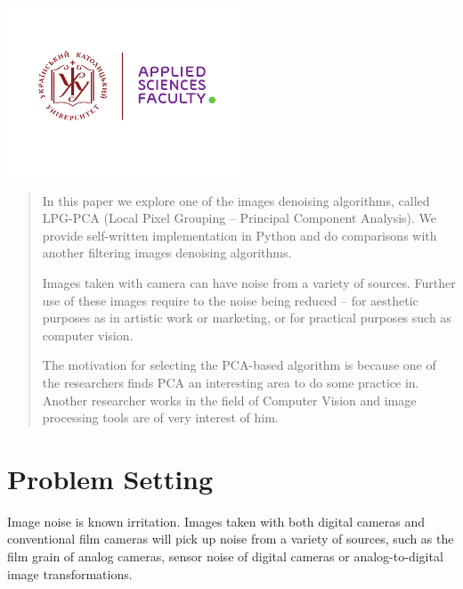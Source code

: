 \begin{titlepage}

\includegraphics[height=5cm]{UCU-Apps.png}\\[1cm] %
 

\vfill %

\end{titlepage}

\begin{abstract}
In this paper we explore one of the images denoising algorithms, called LPG-PCA (Local Pixel Grouping – Principal Component Analysis). We provide self-written implementation in Python and do comparisons with another filtering images denoising algorithms. 

Images taken with camera can have noise from a variety of sources. Further use of these images require to the noise being reduced – for aesthetic purposes as in artistic work or marketing, or for practical purposes such as computer vision. 

The motivation for selecting the PCA-based algorithm is because one of the researchers finds PCA an interesting area to do some practice in. Another researcher works in the field of Computer Vision and image processing tools are of very interest of him.
\end{abstract}

\section{Problem Setting}
Image noise is known irritation. Images taken with both digital cameras and conventional film cameras will pick up noise from a variety of sources, such as the film grain of analog cameras, sensor noise of digital cameras or analog-to-digital image transformations.  

